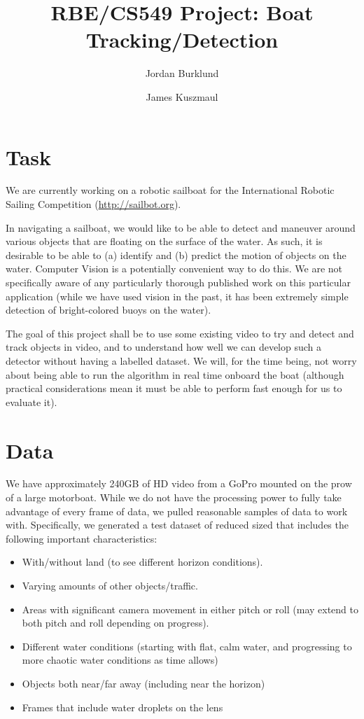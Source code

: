 \documentclass{article}
\title{RBE/CS549 Project: Boat Tracking/Detection}
\author{Jordan Burklund \and James Kuszmaul}
\begin{document}
\maketitle

\tableofcontents

\section{Task}

We are currently working on a robotic sailboat for the
International Robotic Sailing Competition (\url{http://sailbot.org}).

In navigating a sailboat, we would like to be able to
detect and maneuver around various objects
that are floating on the surface of the water. As such,
it is desirable to be able to (a) identify and (b)
predict the motion of objects on the water. Computer
Vision is a potentially convenient way to do this.
We are not specifically aware of any particularly
thorough published work on this particular application
(while we have used vision in the past, it has been
extremely simple detection of bright-colored buoys
on the water).

The goal of this project shall be to use some existing
video to try and detect and track objects in video,
and to understand how well we can develop such a
detector without having a labelled dataset. We will,
for the time being, not worry about being able to run
the algorithm in real time onboard the boat (although
practical considerations mean it must be able to
perform fast enough for us to evaluate it).

\section{Data}

We have approximately 240GB of HD video from a GoPro
mounted on the prow of a large motorboat. While we
do not have the processing power to fully take advantage
of every frame of data, we pulled reasonable samples
of data to work with.  Specifically, we generated a test dataset of reduced sized that includes the following important characteristics:

\begin{itemize}
\item With/without land (to see different horizon conditions).
\item Varying amounts of other objects/traffic.
\item Areas with significant camera movement in either pitch or roll (may extend to both pitch and roll depending on progress).
\item Different water conditions (starting with flat, calm water, and progressing to more chaotic water conditions as time allows)
\item Objects both near/far away (including near the horizon)
\item Frames that include water droplets on the lens
\end{itemize}
\end{document}

